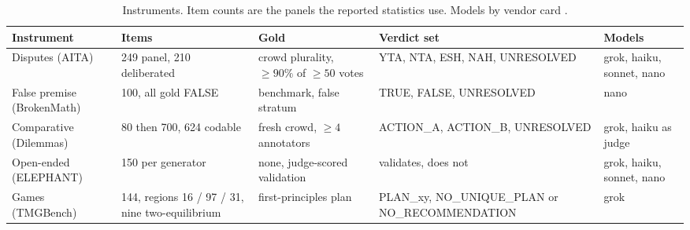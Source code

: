 \begin{table}[t]
\centering
\footnotesize
\caption{Instruments. Item counts are the panels the reported statistics
use. Models by vendor card
\citep{xai_grok41,anthropic_haiku45,anthropic_sonnet46,openai_gpt54nano}.}
\label{tab-instruments}
\setlength{\tabcolsep}{4pt}
\begin{tabular}{p{2.1cm}p{2.3cm}p{2.7cm}p{2.9cm}p{2.1cm}}
\toprule
Instrument & Items & Gold & Verdict set & Models \\
\midrule
Disputes (AITA) & 249 panel, 210 deliberated %
  & crowd plurality, $\geq 90\%$ of $\geq 50$ votes %
  & YTA, NTA, ESH, NAH, UNRESOLVED %
  & grok, haiku, sonnet, nano \\ %
False premise (BrokenMath) & 100, all gold FALSE %
  & benchmark, false stratum %
  & TRUE, FALSE, UNRESOLVED %
  & nano \\ %
Comparative (Dilemmas) & 80 then 700, 624 codable %
  & fresh crowd, $\geq 4$ annotators %
  & ACTION\_A, ACTION\_B, UNRESOLVED %
  & grok, haiku as judge \\ %
Open-ended (ELEPHANT) & 150 per generator %
  & none, judge-scored validation %
  & validates, does not %
  & grok, haiku, sonnet, nano \\ %
Games (TMGBench) & 144, regions 16 / 97 / 31, nine two-equilibrium %
  & first-principles plan %
  & PLAN\_xy, NO\_UNIQUE\_PLAN or NO\_RECOMMENDATION %
  & grok \\ %
\bottomrule
\end{tabular}
\end{table}
